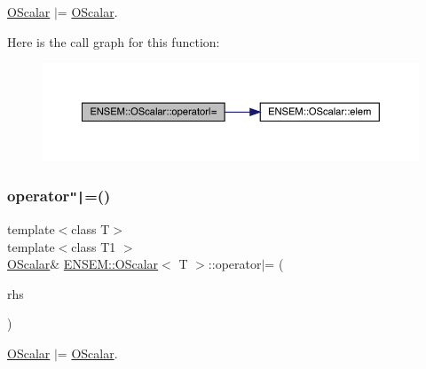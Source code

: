 \mbox{\hyperlink{classENSEM_1_1OScalar}{O\+Scalar}} $\vert$= \mbox{\hyperlink{classENSEM_1_1OScalar}{O\+Scalar}}. 

Here is the call graph for this function\+:
\nopagebreak
\begin{figure}[H]
\begin{center}
\leavevmode
\includegraphics[width=350pt]{da/d80/classENSEM_1_1OScalar_aeffba612ea04593253d41332d6d2aa82_cgraph}
\end{center}
\end{figure}
\mbox{\label{classENSEM_1_1OScalar_aeffba612ea04593253d41332d6d2aa82}} 
\subsubsection{\texorpdfstring{operator\texttt{"|}=()}{operator|=()}\hspace{0.1cm}{\footnotesize\ttfamily [2/3]}}
{\footnotesize\ttfamily template$<$class T$>$ \\
template$<$class T1 $>$ \\
\mbox{\hyperlink{classENSEM_1_1OScalar}{O\+Scalar}}\& \mbox{\hyperlink{classENSEM_1_1OScalar}{E\+N\+S\+E\+M\+::\+O\+Scalar}}$<$ T $>$\+::operator$\vert$= (\begin{DoxyParamCaption}\item[{const \mbox{\hyperlink{classENSEM_1_1OScalar}{O\+Scalar}}$<$ T1 $>$ \&}]{rhs }\end{DoxyParamCaption})\hspace{0.3cm}{\ttfamily [inline]}}



\mbox{\hyperlink{classENSEM_1_1OScalar}{O\+Scalar}} $\vert$= \mbox{\hyperlink{classENSEM_1_1OScalar}{O\+Scalar}}. 

